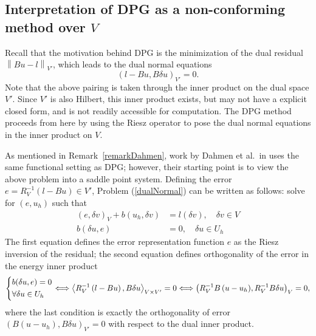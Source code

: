 \documentclass[11pt,onecolumn]{scrartcl}
\newcommand{\nor}[1]{\left\| #1 \right\|}
\newcommand{\LRp}[1]{\left( #1 \right)}
\newcommand{\LRa}[1]{\left\langle #1 \right\rangle}
\begin{document}
%
%
%

\subsection{Interpretation of DPG as a non-conforming method over $V$}

Recall that the motivation behind DPG is the minimization of the dual residual $\nor{Bu-l}_{V'}$, which leads to the dual normal equations
\begin{equation}
\label{dualNormal}
\LRp{l-Bu,B\delta u}_{V'} = 0.
\end{equation}
Note that the above pairing is taken through the inner product on the dual space $V'$. Since $V'$ is also Hilbert, this inner product exists, but may not have a explicit closed form, and is not readily accessible for computation.  The DPG method proceeds from here by using the Riesz operator to pose the dual normal equations in the inner product on $V$.

As mentioned in Remark~\ref{remarkDahmen}, work by Dahmen et al.\ in \cite{DahmenVariationalStabilization} uses the same functional setting as DPG; however, their starting point is to view the above problem into a saddle point system.  Defining the error $e = R_V^{-1}\LRp{l-Bu} \in V'$, Problem (\ref{dualNormal}) can be written as follows: solve for $\LRp{e,u_h}$ such that
\begin{align*}
\LRp{e,\delta v}_V + b(u_h,\delta v)&= l(\delta v),\quad \delta v \in V\\
b(\delta u, e) &= 0, \quad \delta u \in U_h
\end{align*}
The first equation defines the error representation function $e$ as the Riesz inversion of the residual; the second equation defines orthogonality of the error in the energy inner product 
\[
\begin{dcases}
b(\delta u, e) = 0\\
\forall \delta u \in U_h 
\end{dcases}
\Longleftrightarrow \LRa{R_V^{-1}\LRp{l-Bu},B\delta u}_{V\times V'} = 0 \Longleftrightarrow \LRp{R_V^{-1}{B\LRp{u-u_h}},R_V^{-1}B\delta u}_{V}= 0,
\]
where the last condition is exactly the orthogonality of error $\LRp{B\LRp{u-u_h},B\delta u}_{V'}= 0$ with respect to the dual inner product.
\end{document}
